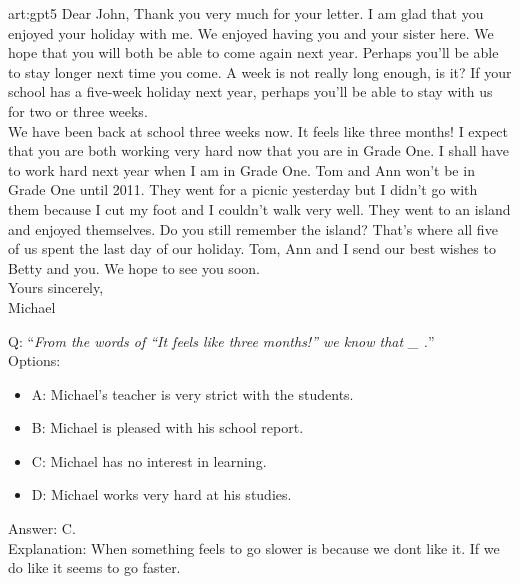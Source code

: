\begin{passage}{art:gpt5}
 Dear John, Thank you very much for your letter. I am glad that you enjoyed your holiday with me. We enjoyed having you and your sister here. We hope that you will both be able to come again next year. Perhaps you'll be able to stay longer next time you come. A week is not really long enough, is it? If your school has a five-week holiday next year, perhaps  you'll be able to stay with us for two or three weeks. \\
We have been back at school three weeks now. It feels like three months! I expect  that you are both working very hard now that you are in Grade One. I shall have to work hard next year when I am in Grade One. Tom and Ann won't be in Grade One until 2011.
They went for a picnic yesterday but I didn't go with them because I cut my foot and I couldn't walk very well. They went to an island and enjoyed themselves. Do you still remember the island? That's where all five of us spent the last day of our holiday.
Tom, Ann and I send our best wishes to Betty and you. We hope to see you soon. \\
Yours sincerely, \\
Michael
\end{passage}
Q: ``\emph{From the words of  ``It feels like three months!'' we know that  \_  .}''\\
Options: 
\begin{itemize} 
 \item A: Michael's teacher is very strict with the students.
 \item B: Michael is pleased with his school report.
 \item C: Michael has no interest in learning.
 \item D: Michael works very hard at his studies.
\end{itemize}
Answer: C. \\
Explanation: When something feels to go slower is because we dont like it. If we do like it seems to go faster.
